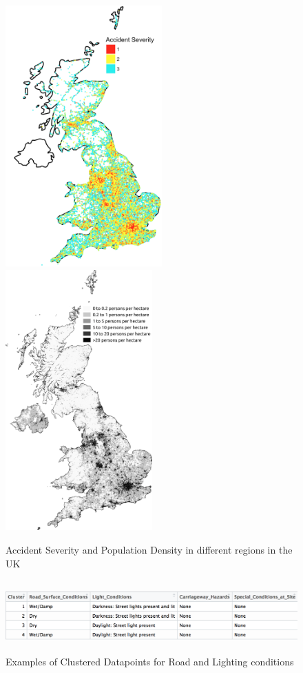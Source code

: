 \documentclass{neu_handout}
\begin{document}
\begin{figure}[!htb]
  \includegraphics[height=10cm,width=0.8\linewidth]{accident-severity.png}
\endminipage\hfill
{}
  \includegraphics[height=10cm,width=0.8\linewidth]{population-density.png}
  \endminipage
\caption{Accident Severity and Population Density in different regions in the UK}  
\end{figure}

\begin{figure}[!htb]
    \begin{center}
      \includegraphics[height=2.75cm,width=17cm]{cluster-eg.png}
      \caption{Examples of Clustered Datapoints for Road and Lighting conditions}
    \end{center}
\end{figure}
\end{document}
